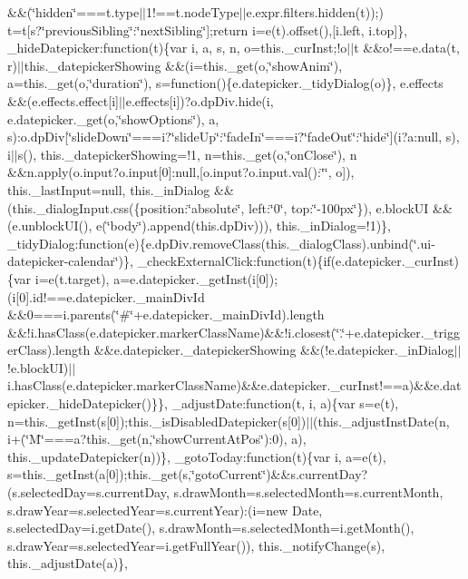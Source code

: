 \begin{DoxyCompactItemize}
\&\&(\char`\"{}hidden\char`\"{}===t.\+type$\vert$$\vert$1!==t.\+node\+Type$\vert$$\vert$e.\+expr.\+filters.\+hidden(t));) t=t\mbox{[}s?\char`\"{}previous\+Sibling\char`\"{}\+:\char`\"{}next\+Sibling\char`\"{}\mbox{]};return i=e(t).\+offset(),\mbox{[}i.\+left, i.\+top\mbox{]}\}, \+\_\+hide\+Datepicker\+:function(t)\{var i, a, s, n, o=this.\+\_\+cur\+Inst;!o$\vert$$\vert$t \&\&o!==e.\+data(t, r)$\vert$$\vert$this.\+\_\+datepicker\+Showing \&\&(i=this.\+\_\+get(o,\char`\"{}show\+Anim\char`\"{}), a=this.\+\_\+get(o,\char`\"{}duration\char`\"{}), s=function()\{e.\+datepicker.\+\_\+tidy\+Dialog(o)\}, e.\+effects \&\&(e.\+effects.\+effect\mbox{[}i\mbox{]}$\vert$$\vert$e.\+effects\mbox{[}i\mbox{]})?o.\+dp\+Div.\+hide(i, e.\+datepicker.\+\_\+get(o,\char`\"{}show\+Options\char`\"{}), a, s)\+:o.\+dp\+Div\mbox{[}\char`\"{}slide\+Down\char`\"{}===i?\char`\"{}slide\+Up\char`\"{}\+:\char`\"{}fade\+In\char`\"{}===i?\char`\"{}fade\+Out\char`\"{}\+:\char`\"{}hide\char`\"{}\mbox{]}(i?a\+:null, s), i$\vert$$\vert$s(), this.\+\_\+datepicker\+Showing=!1, n=this.\+\_\+get(o,\char`\"{}on\+Close\char`\"{}), n \&\&n.\+apply(o.\+input?o.\+input\mbox{[}0\mbox{]}\+:null,\mbox{[}o.\+input?o.\+input.\+val()\+:\char`\"{}\char`\"{}, o\mbox{]}), this.\+\_\+last\+Input=null, this.\+\_\+in\+Dialog \&\&(this.\+\_\+dialog\+Input.\+css(\{position\+:\char`\"{}absolute\char`\"{}, left\+:\char`\"{}0\char`\"{}, top\+:\char`\"{}-\/100px\char`\"{}\}), e.\+block\+U\+I \&\&(e.\+unblock\+U\+I(), e(\char`\"{}body\char`\"{}).\+append(this.\+dp\+Div))), this.\+\_\+in\+Dialog=!1)\}, \+\_\+tidy\+Dialog\+:function(e)\{e.\+dp\+Div.\+remove\+Class(this.\+\_\+dialog\+Class).\+unbind(\char`\"{}.\+ui-\/datepicker-\/calendar\char`\"{})\}, \+\_\+check\+External\+Click\+:function(t)\{if(e.\+datepicker.\+\_\+cur\+Inst)\{var i=e(t.\+target), a=e.\+datepicker.\+\_\+get\+Inst(i\mbox{[}0\mbox{]});(i\mbox{[}0\mbox{]}.\+id!==e.\+datepicker.\+\_\+main\+Div\+Id \&\&0===i.\+parents(\char`\"{}\#\char`\"{}+e.\+datepicker.\+\_\+main\+Div\+Id).\+length \&\&!i.\+has\+Class(e.\+datepicker.\+marker\+Class\+Name)\&\&!i.\+closest(\char`\"{}.\char`\"{}+e.\+datepicker.\+\_\+trigger\+Class).\+length \&\&e.\+datepicker.\+\_\+datepicker\+Showing \&\&(!e.\+datepicker.\+\_\+in\+Dialog$\vert$$\vert$!e.\+block\+U\+I)$\vert$$\vert$i.\+has\+Class(e.\+datepicker.\+marker\+Class\+Name)\&\&e.\+datepicker.\+\_\+cur\+Inst!==a)\&\&e.\+datepicker.\+\_\+hide\+Datepicker()\}\}, \+\_\+adjust\+Date\+:function(t, i, a)\{var s=e(t), n=this.\+\_\+get\+Inst(s\mbox{[}0\mbox{]});this.\+\_\+is\+Disabled\+Datepicker(s\mbox{[}0\mbox{]})$\vert$$\vert$(this.\+\_\+adjust\+Inst\+Date(n, i+(\char`\"{}\+M\char`\"{}===a?this.\+\_\+get(n,\char`\"{}show\+Current\+At\+Pos\char`\"{})\+:0), a), this.\+\_\+update\+Datepicker(n))\}, \+\_\+goto\+Today\+:function(t)\{var i, a=e(t), s=this.\+\_\+get\+Inst(a\mbox{[}0\mbox{]});this.\+\_\+get(s,\char`\"{}goto\+Current\char`\"{})\&\&s.\+current\+Day?(s.\+selected\+Day=s.\+current\+Day, s.\+draw\+Month=s.\+selected\+Month=s.\+current\+Month, s.\+draw\+Year=s.\+selected\+Year=s.\+current\+Year)\+:(i=new Date, s.\+selected\+Day=i.\+get\+Date(), s.\+draw\+Month=s.\+selected\+Month=i.\+get\+Month(), s.\+draw\+Year=s.\+selected\+Year=i.\+get\+Full\+Year()), this.\+\_\+notify\+Change(s), this.\+\_\+adjust\+Date(a)\}, 
\end{DoxyCompactItemize}
